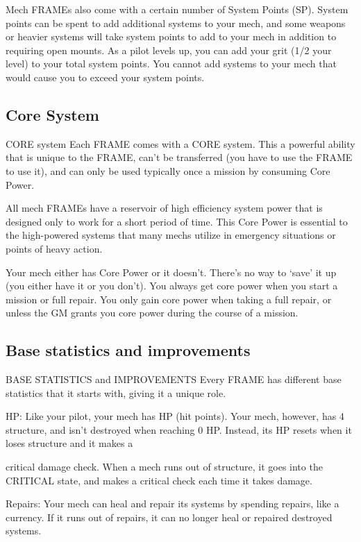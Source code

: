 Mech FRAMEs also come with a certain number of System Points (SP). System points can be
spent to add additional systems to your mech, and some weapons or heavier systems will take
system points to add to your mech in addition to requiring open mounts. As a pilot levels up, you
can add your grit (1/2 your level) to your total system points. You cannot add systems to your
mech that would cause you to exceed your system points.

\subsection{Core System}
                                             CORE system
Each FRAME comes with a CORE system. This a powerful ability that is unique to the FRAME,
can’t be transferred (you have to use the FRAME to use it), and can only be used typically once a
mission by consuming Core Power.


All mech FRAMEs have a reservoir of high efficiency system power that is designed only to work
for a short period of time. This Core Power is essential to the high-powered systems that many
mechs utilize in emergency situations or points of heavy action.


Your mech either has Core Power or it doesn’t. There’s no way to ‘save’ it up (you either have it
or you don’t). You always get core power when you start a mission or full repair. You only gain
core power when taking a full repair, or unless the GM grants you core power during the course
of a mission.

\subsection{Base statistics and improvements}
                         BASE STATISTICS and IMPROVEMENTS
Every FRAME has different base statistics that it starts with, giving it a unique role.


HP: Like your pilot, your mech has HP (hit points). Your mech, however, has 4 structure, and
isn’t destroyed when reaching 0 HP. Instead, its HP resets when it loses structure and it makes a




critical damage check. When a mech runs out of structure, it goes into the CRITICAL state, and
makes a critical check each time it takes damage.

Repairs: Your mech can heal and repair its systems by spending repairs, like a currency. If it runs
out of repairs, it can no longer heal or repaired destroyed systems.

